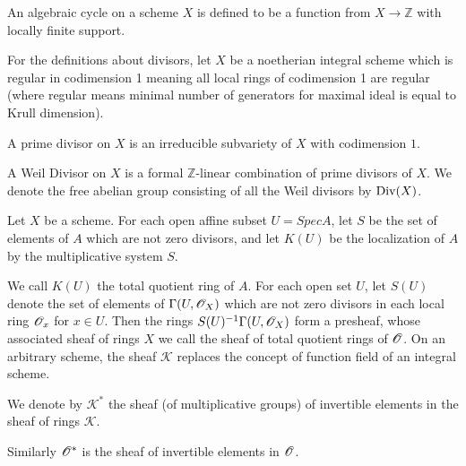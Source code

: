 %

\begin{definition}
  \label{def:algcycle}
  \leanok
  An algebraic cycle on a scheme $X$ is defined to be a function from
  $X \rightarrow \mathbb{Z}$ with locally finite support.
\end{definition}




For the definitions about divisors, let $X$ be a noetherian integral scheme
which is regular in codimension 1 meaning all local rings of codimension 1 are
regular (where regular means minimal number of generators for maximal ideal is
equal to Krull dimension).

\begin{definition}\label{def:primediv}
  A prime divisor on $X$ is an irreducible subvariety of $X$ with codimension $1$.
  \end{definition}

\begin{definition}\label{def:weil}
  A Weil Divisor on $X$ is a formal $\mathbb{Z}$-linear combination of prime divisors of $X$. We denote the free abelian group consisting of all the Weil divisors by $\operatorname{Div}(X)$.
\end{definition}

\begin{definition}[Hartshorne p.140]\label{def:constratsheaf}
  Let $X$ be a scheme. For each open affine subset $U = Spec A$,
  let $S$ be the set of elements of $A$ which are not zero divisors,
  and let $K(U)$ be the localization of $A$ by the multiplicative system $S$.

  We call $K(U)$ the total quotient ring of $A$.
  For each open set $U$, let $S(U)$ denote the set of elements of
  $\Gamma(U, \mathscr{O}_X)$ which are not zero divisors in each local ring $\mathscr{O}_x$ for $x \in U$.
  Then the rings $S(U)^{-1} \Gamma(U,\mathscr{O}_X)$ form a presheaf,
  whose associated sheaf of rings $X$ we call the sheaf of total quotient rings
  of $\mathscr{O}$. On an arbitrary scheme, the sheaf $\mathscr{K}$ replaces the concept
  of function field of an integral scheme.

  We denote by $\mathscr{K}^*$ the sheaf (of multiplicative groups)
  of invertible elements in the sheaf of rings $\mathscr{K}$.

  Similarly $\mathscr{O}^*$ is the sheaf of invertible elements in $\mathscr{O}$.
\end{definition}

